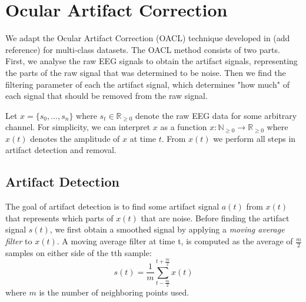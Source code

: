 \section{Ocular Artifact Correction}
We adapt the  Ocular Artifact Correction (OACL) technique developed in (add reference) for multi-class datasets. The OACL method consists of two parts. First, we analyse the raw EEG signals to obtain the artifact signals, representing the parts of the raw signal that was determined to be noise. Then we find the filtering parameter of each the artifact signal, which determines "how much" of each signal that should be removed from the raw signal. 

Let $x = \{s_0, ...,s_n\}$ where $s_t \in \mathbb{R}_{\geq 0}$ denote the raw EEG data for some arbitrary channel. For simplicity, we can interpret $x$ as a function $x : \mathbb{N}_{\geq 0} \rightarrow \mathbb{R}_{\geq 0}$ where $x(t)$ denotes the amplitude of $x$ at time $t$. 
From $x(t)$ we perform all steps in artifact detection and removal.


\subsection{Artifact Detection}
The goal of artifact detection is to find some artifact signal $a(t)$ from $x(t)$ that represents which parts of $x(t)$ that are noise. Before finding the artifact signal $s(t)$, we first obtain a smoothed signal by applying a \emph{moving average filter} to $x(t)$. A moving average filter at time t, is computed as the average of $\frac{m}{2}$ samples on either side of the tth sample:
\begin{equation}
\label{eq:movavg}
s(t) = \frac{1}{m}\sum_{t-\frac{m}{2}}^{t+\frac{m}{2}}x(t)
\end{equation}
where $m$ is the number of neighboring points used.

